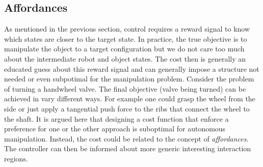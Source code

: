 \subsection{Affordances}
As mentioned in the previous section, control requires a reward signal to know which states are closer to the target state. In practice, the true objective is to manipulate the object to a target configuration but we do not care too much about the intermediate robot and object states. The cost then is generally an educated guess about this reward signal and can generally impose a structure not needed or even subpotimal for the manipulation problem. Consider the problem of turning a handwheel valve. The final objective (valve being turned) can be achieved in vary different ways. For example one could grasp the wheel from the side or just apply a tangential push force to the ribs that connect the wheel to the shaft. It is argued here that designing a cost function that enforce a preference for one or the other approach is suboptimal for autonomous manipulation. Instead, the cost could be related to the concept of \emph{affordances}. The controller can then be informed about more generic interesting interaction regions.

